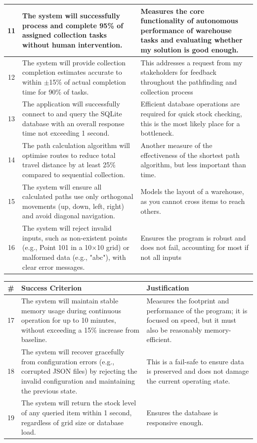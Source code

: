 \begin{table}[htbp!]
\begin{tabularx}{\textwidth}{|c|X|X|}
		\hline
		11 & The system will successfully process and complete 95\% of assigned collection tasks without human intervention. & Measures the core functionality of autonomous performance of warehouse tasks and evaluating whether my solution is good enough. \\
		\hline
		12 & The system will provide collection completion estimates accurate to within $\pm$15\% of actual completion time for 90\% of tasks. & This addresses a request from my stakeholders for feedback throughout the pathfinding and collection process \\
		\hline
		13 & The application will successfully connect to and query the SQLite database with an overall response time not exceeding 1 second. & Efficient database operations are required for quick stock checking, this is the most likely place for a bottleneck. \\
		\hline
		14 & The path calculation algorithm will optimise routes to reduce total travel distance by at least 25\% compared to sequential collection. & Another measure of the effectiveness of the shortest path algorithm, but less important than time. \\
		\hline
		15 & The system will ensure all calculated paths use only orthogonal movements (up, down, left, right) and avoid diagonal navigation. & Models the layout of a warehouse, as you cannot cross items to reach others. \\
		\hline
		16 & The system will reject invalid inputs, such as non-existent points (e.g., Point 101 in a 10×10 grid) or malformed data (e.g., "abc"), with clear error messages. & Ensures the program is robust and does not fail, accounting for most if not all inputs \\
		\hline
		\end{tabularx}
		\end{table}
		\newpage
		\begin{table}[htbp]
		\centering
		\begin{tabularx}{\textwidth}{|c|X|X|}
		\hline
		\textbf{\#} & \textbf{Success Criterion} & \textbf{Justification} \\
		\hline
		17 & The system will maintain stable memory usage during continuous operation for up to 10 minutes, without exceeding a 15\% increase from baseline. & Measures the footprint and performance of the program; it is focused on speed, but it must also be reasonably memory-efficient. \\
		\hline
		18 & The system will recover gracefully from configuration errors (e.g., corrupted JSON files) by rejecting the invalid configuration and maintaining the previous state. & This is a fail-safe to ensure data is preserved and does not damage the current operating state. \\
		\hline
		19 & The system will return the stock level of any queried item within 1 second, regardless of grid size or database load. & Ensures the database is responsive enough. \\
		\hline
	\end{tabularx}
\end{table}

